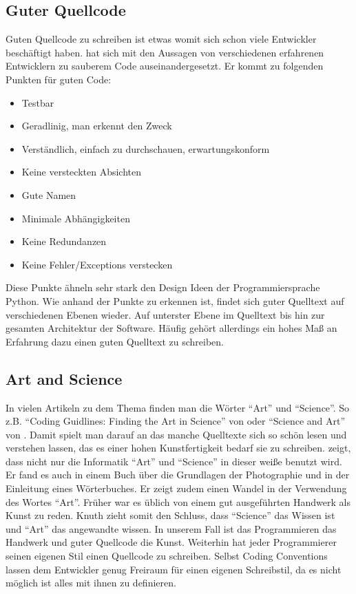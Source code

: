 \subsection{Guter Quellcode}

Guten Quellcode zu schreiben ist etwas womit sich schon viele Entwickler beschäftigt haben\cite{Martin, Green, Spinellis, reed}.
\cite[S. 32f.]{Martin} hat sich mit den Aussagen von verschiedenen erfahrenen Entwicklern zu sauberem Code auseinandergesetzt.
Er kommt zu folgenden Punkten für guten Code:

\begin{itemize}
\item Testbar
\item Geradlinig, man erkennt den Zweck
\item Verständlich, einfach zu durchschauen, erwartungskonform
\item Keine versteckten Absichten
\item Gute Namen
\item Minimale Abhängigkeiten
\item Keine Redundanzen
\item Keine Fehler/Exceptions verstecken
\end{itemize}

Diese Punkte ähneln sehr stark den Design Ideen der Programmiersprache Python\cite{Peters}.
Wie anhand der Punkte zu erkennen ist, findet sich guter Quelltext auf verschiedenen Ebenen wieder. Auf unterster Ebene im Quelltext bis hin zur gesamten Architektur der Software. Häufig gehört allerdings ein hohes Maß an Erfahrung dazu einen guten Quelltext zu schreiben.


\subsection{Art and Science}

In vielen Artikeln zu dem Thema finden man die Wörter \enquote{Art} und \enquote{Science}. So z.B.
\enquote{Coding Guidlines: Finding the Art in Science} von \cite{Green} oder \enquote{Science and Art} von \cite[S. 669]{Knuth}.
Damit spielt man darauf an das manche Quelltexte sich so schön lesen und verstehen lassen, das es einer hohen Kunstfertigkeit bedarf sie zu schreiben. \cite[S. 669]{Knuth} zeigt, dass nicht nur die Informatik \enquote{Art} und \enquote{Science} in dieser weiße benutzt wird. Er fand es auch in einem Buch über die Grundlagen der Photographie und in der Einleitung eines Wörterbuches\cite[S. 669]{Knuth}.
Er zeigt zudem einen Wandel in der Verwendung des Wortes \enquote{Art}.
Früher war es üblich von einem gut ausgeführten Handwerk als Kunst zu reden.
Knuth zieht somit den Schluss, dass \enquote{Science} das Wissen ist und \enquote{Art} das angewandte wissen.
In unserem Fall ist das Programmieren das Handwerk und guter Quellcode die Kunst.
Weiterhin hat jeder Programmierer seinen eigenen Stil einen Quellcode zu schreiben.
Selbst Coding Conventions lassen dem Entwickler genug Freiraum für einen eigenen Schreibstil, da es nicht möglich ist alles mit ihnen zu definieren.



